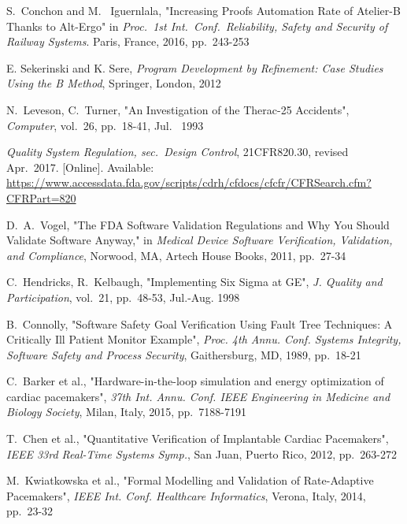 \documentclass[11pt,journal]{IEEEtran}
\begin{document}
	\IEEEPARstart{}{} 
	
	\begin{thebibliography}{2}
		S.~Conchon and M.~ Iguernlala, "Increasing Proofs Automation Rate of Atelier-B Thanks to Alt-Ergo" in \emph{Proc.~1st Int.~Conf.~Reliability, Safety and Security of Railway Systems}. Paris, France, 2016, pp.~243-253
		
		E. Sekerinski and K. Sere, \emph{Program Development by Refinement: Case Studies Using the B Method}, Springer, London, 2012
		
		N.~Leveson, C.~Turner, "An Investigation of the Therac-25 Accidents", \emph{Computer}, vol.~26, pp.~18-41, Jul.~ 1993
		
		\emph{Quality System Regulation, sec.~Design Control}, 21CFR820.30, revised Apr.~2017. [Online]. Available:
		\url{https://www.accessdata.fda.gov/scripts/cdrh/cfdocs/cfcfr/CFRSearch.cfm?CFRPart=820}
		
		D.~A.~Vogel, "The FDA Software Validation Regulations and Why You Should Validate Software Anyway," in \emph{Medical Device Software Verification, Validation, and Compliance}, Norwood, MA, Artech House Books, 2011, pp.~27-34
		
		C.~Hendricks, R.~Kelbaugh, "Implementing Six Sigma at GE", \emph{J. Quality and Participation}, vol.~21, pp.~48-53, Jul.-Aug. 1998
		
		B.~Connolly, "Software Safety Goal Verification Using Fault Tree Techniques: A Critically Ill Patient Monitor Example", \emph{Proc. 4th Annu. Conf. Systems Integrity, Software Safety and Process Security}, Gaithersburg, MD, 1989, pp.~18-21
		
		C.~Barker et al., "Hardware-in-the-loop simulation and energy optimization of cardiac	pacemakers", \emph{37th Int. Annu. Conf. IEEE Engineering in Medicine and Biology Society}, Milan, Italy, 2015, pp.~7188-7191
		
		T.~Chen et al., "Quantitative Verification of Implantable Cardiac Pacemakers", \emph{IEEE 33rd Real-Time Systems Symp.}, San Juan, Puerto Rico, 2012, pp.~263-272
		
		M.~Kwiatkowska et al., "Formal Modelling and Validation of Rate-Adaptive Pacemakers", \emph{IEEE Int. Conf. Healthcare Informatics}, Verona, Italy, 2014, pp.~23-32
		

\end{thebibliography}
\end{document}
